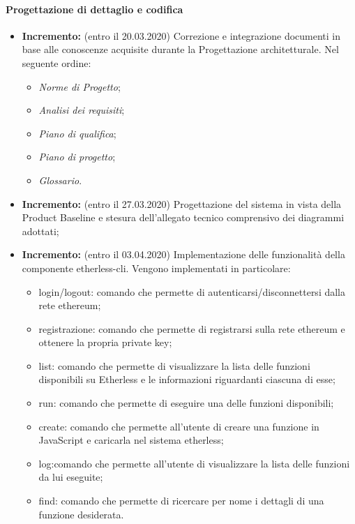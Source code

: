 \paragraph{Progettazione di dettaglio e codifica}
\begin{itemize}
	\item \textbf{ Incremento:} (entro il 20.03.2020) Correzione e integrazione documenti in base alle conoscenze acquisite durante la Progettazione architetturale. Nel seguente ordine:
  \begin{itemize}
    \item \textit{Norme di Progetto}\docs;
    \item \textit{Analisi dei requisiti}\docs;
    \item \textit{Piano di qualifica}\docs;
    \item \textit{Piano di progetto}\docs;
    \item \textit{Glossario}\docs.
  \end{itemize}
	\item \textbf{ Incremento:} (entro il 27.03.2020) Progettazione del sistema in vista della Product Baseline e stesura dell'allegato tecnico comprensivo dei diagrammi adottati;
	\item \textbf{ Incremento:} (entro il 03.04.2020) Implementazione delle funzionalità della componente etherless-cli.
  Vengono implementati in particolare:
  \begin{itemize}
    \item login/logout: comando che permette di autenticarsi/disconnettersi dalla rete ethereum;
    \item registrazione: comando che permette di registrarsi sulla rete ethereum e ottenere la propria private key;
    \item list: comando che permette di visualizzare la lista delle funzioni disponibili su Etherless e le informazioni riguardanti ciascuna di esse;
    \item run: comando che permette di eseguire una delle funzioni disponibili;
    \item create: comando che permette all'utente di creare una funzione in JavaScript e caricarla nel sistema etherless;
    \item log:comando che permette all'utente di visualizzare la lista delle funzioni da lui eseguite;
    \item find: comando che permette di ricercare per nome i dettagli di una funzione desiderata.
  \end{itemize}

\end{itemize}
